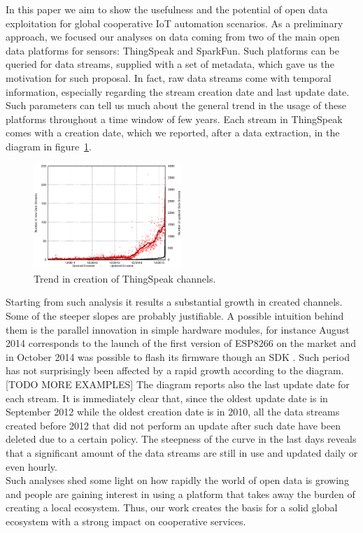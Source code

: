 In this paper we aim to show the usefulness and the potential of open data exploitation for global cooperative IoT automation scenarios.
As a preliminary approach, we focused our analyses on data coming from two of the main open data platforms for sensors: ThingSpeak and SparkFun.
Such platforms can be queried for data streams, supplied with a set of metadata, which gave us the motivation for such proposal.
In fact, raw data streams come with temporal information, especially regarding the stream creation date and last update date.
Such parameters can tell us much about the general trend in the usage of these platforms throughout a time window of few years.
Each stream in ThingSpeak comes with a creation date, which we reported, after a data extraction, in the diagram in figure~\ref{creationtrend}.
\begin{figure}[!b]
\centering
\includegraphics[width=0.50\textwidth]{img/bars.eps} 
\caption{Trend in creation of ThingSpeak channels.}
\label{creationtrend}
\end{figure}
Starting from such analysis it results a substantial growth in created channels.
Some of the steeper slopes are probably justifiable.
A possible intuition behind them is the parallel innovation in simple hardware modules, for instance August 2014 corresponds to the launch of the first version of ESP8266 \cite{esp8266} on the market and in October 2014 was possible to flash its firmware though an SDK \cite{espressif}.
Such period has not surprisingly been affected by a rapid growth according to the diagram. [TODO MORE EXAMPLES]
The diagram reports also the last update date for each stream.
It is immediately clear that, since the oldest update date is in September 2012 while the oldest creation date is in 2010, all the data streams created before 2012 that did not perform an update after such date have been deleted due to a certain policy.
The steepness of the curve in the last days reveals that a significant amount of the data streams are still in use and updated daily or even hourly.
\\

Such analyses shed some light on how rapidly the world of open data is growing and people are gaining interest in using a platform that takes away the burden of creating a local ecosystem.
Thus, our work creates the basis for a solid global ecosystem with a strong impact on cooperative services.